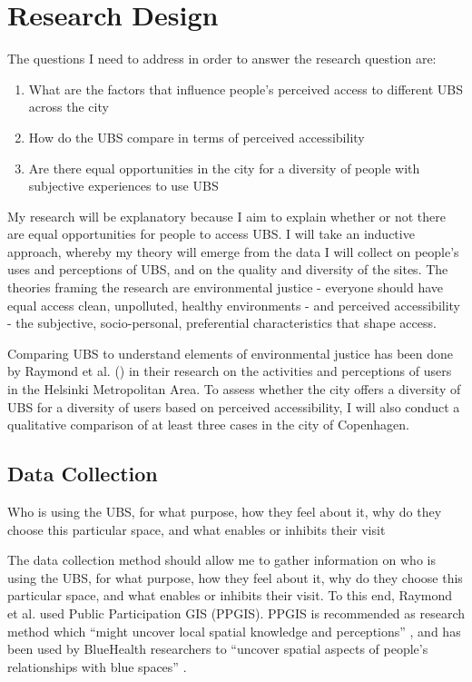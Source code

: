 \documentclass{article}
\begin{document}
\section{Research Design}

The questions I need to address in order to answer the research question are:

\begin{enumerate}
	\item What are the factors that influence people's perceived access to different UBS across the city
	\item How do the UBS compare in terms of perceived accessibility
	\item Are there equal opportunities in the city for a diversity of people with subjective experiences to use UBS
\end{enumerate}

My research will be explanatory because I aim to explain whether or not there are equal opportunities for people to access UBS. I will take an inductive approach, whereby my theory will emerge from the data I will collect on people’s uses and perceptions of UBS, and on the quality and diversity of the sites. The theories framing the research are environmental justice - everyone should have equal access clean, unpolluted, healthy environments - and perceived accessibility - the subjective, socio-personal, preferential characteristics that shape access. 

Comparing UBS to understand elements of environmental justice has been done by Raymond et al. (\citeyear{raymond2016integrating}) in their research on the activities and perceptions of users in the Helsinki Metropolitan Area. To assess whether the city offers a diversity of UBS for a diversity of users based on perceived accessibility, I will also conduct a qualitative comparison of at least three cases in the city of Copenhagen.

\subsection{Data Collection}

Who is using the UBS, for what purpose, how they feel about it, why do they choose this particular space, and what enables or inhibits their visit

The data collection method should allow me to gather information on who is using the UBS, for what purpose, how they feel about it, why do they choose this particular space, and what enables or inhibits their visit. To this end, Raymond et al. used Public Participation GIS (PPGIS). PPGIS is recommended as research method which “might uncover local spatial knowledge and perceptions” \parencite{anguelovski2020expanding}, and has been used by BlueHealth researchers to “uncover spatial aspects of people’s relationships with blue spaces” \parencite{bluehealthsoftgis}.
\end{document}
